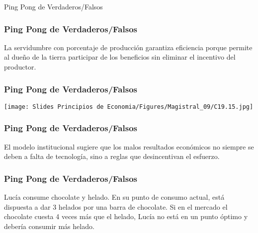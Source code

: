 \documentclass{beamer}
\begin{document}
\begin{frame}{Ping Pong de Verdaderos/Falsos}
\begin{figure}[h!]
\begin{center}
        \end{center}
    \end{figure}
\end{frame}


\begin{frame}
\frametitle{Ping Pong de Verdaderos/Falsos}
\centering

La servidumbre con porcentaje de producción garantiza eficiencia porque permite al dueño de la tierra participar de los beneficios sin eliminar el incentivo del productor.

\end{frame}


\begin{frame}
\frametitle{Ping Pong de Verdaderos/Falsos}
    \centering
    \texttt{[image: Slides Principios de Economia/Figures/Magistral\_09/C19.15.jpg]}

\end{frame}

\begin{frame}
\frametitle{Ping Pong de Verdaderos/Falsos}
\centering
El modelo institucional sugiere que los malos resultados económicos no siempre se deben a falta de tecnología, sino a reglas que desincentivan el esfuerzo.
\end{frame}


\begin{frame}
\frametitle{Ping Pong de Verdaderos/Falsos}
\centering
Lucía consume chocolate y helado. En su punto de consumo actual, está dispuesta a dar 3 helados por una barra de chocolate. Si en el mercado el chocolate cuesta 4 veces más que el helado, Lucía no está en un punto óptimo y debería consumir más helado.
\end{frame}
\end{document}
